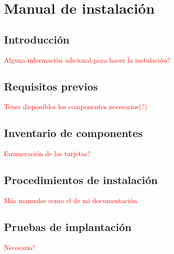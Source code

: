 \chapter{Manual de instalación}
\section{Introducción}
\textcolor{red}{Alguna información adicional para hacer la instalación?}

\section{Requisitos previos}
\textcolor{red}{Tener disponibles los componentes necesarios(?)}

\section{Inventario de componentes}
\textcolor{red}{Enumeración de las tarjetas?}

\section{Procedimientos de instalación}
\textcolor{red}{Más manuales como el de mi documentación}

\section{Pruebas de implantación}
\textcolor{red}{Necesario?}